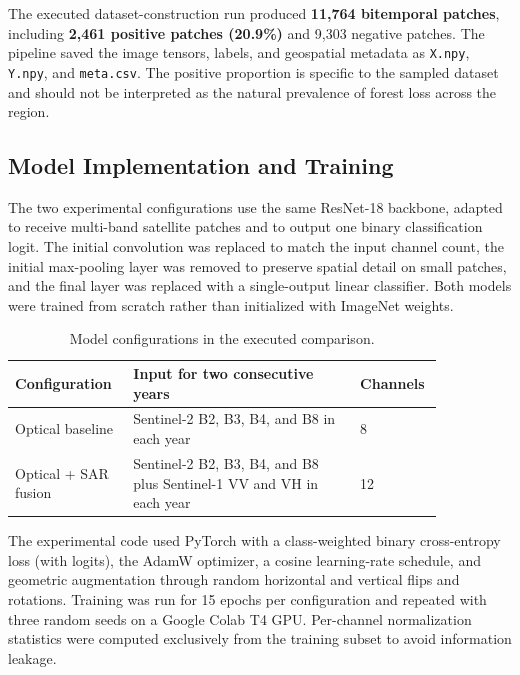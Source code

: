 \documentclass{article}
\begin{document}
The executed dataset-construction run produced \textbf{11,764 bitemporal patches}, including \textbf{2,461 positive patches (20.9\%)} and 9,303 negative patches. The pipeline saved the image tensors, labels, and geospatial metadata as \texttt{X.npy}, \texttt{Y.npy}, and \texttt{meta.csv}. The positive proportion is specific to the sampled dataset and should not be interpreted as the natural prevalence of forest loss across the region.

\subsection{Model Implementation and Training}
\label{subsec:prototype-model}

The two experimental configurations use the same ResNet-18 backbone, adapted to receive multi-band satellite patches and to output one binary classification logit. The initial convolution was replaced to match the input channel count, the initial max-pooling layer was removed to preserve spatial detail on small patches, and the final layer was replaced with a single-output linear classifier. Both models were trained from scratch rather than initialized with ImageNet weights.

\begin{table}[htbp]
\centering
\small
\caption{Model configurations in the executed comparison.}
\label{tab:prototype-configurations}
\begin{tabular}{|p{0.22\linewidth}|p{0.49\linewidth}|p{0.14\linewidth}|}
\hline
\textbf{Configuration} & \textbf{Input for two consecutive years} & \textbf{Channels} \\ \hline
Optical baseline & Sentinel-2 B2, B3, B4, and B8 in each year & 8 \\ \hline
Optical + SAR fusion & Sentinel-2 B2, B3, B4, and B8 plus Sentinel-1 VV and VH in each year & 12 \\ \hline
\end{tabular}
\end{table}

The experimental code used PyTorch with a class-weighted binary cross-entropy loss (with logits), the AdamW optimizer, a cosine learning-rate schedule, and geometric augmentation through random horizontal and vertical flips and rotations. Training was run for 15 epochs per configuration and repeated with three random seeds on a Google Colab T4 GPU. Per-channel normalization statistics were computed exclusively from the training subset to avoid information leakage.
\end{document}

